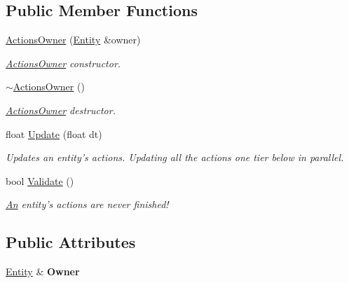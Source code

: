 \subsection*{Public Member Functions}
\begin{DoxyCompactItemize}
\item 
\hyperlink{classDCEngine_1_1ActionsOwner_a153d50a0c2e46d09d5896a21312e8f9f}{Actions\-Owner} (\hyperlink{classDCEngine_1_1Entity}{Entity} \&owner)
\begin{DoxyCompactList}\small\item\em \hyperlink{classDCEngine_1_1ActionsOwner}{Actions\-Owner} constructor. \end{DoxyCompactList}\item 
\hypertarget{classDCEngine_1_1ActionsOwner_ab79db9c50826b66f606ed06d115bc331}{\hyperlink{classDCEngine_1_1ActionsOwner_ab79db9c50826b66f606ed06d115bc331}{$\sim$\-Actions\-Owner} ()}\label{classDCEngine_1_1ActionsOwner_ab79db9c50826b66f606ed06d115bc331}

\begin{DoxyCompactList}\small\item\em \hyperlink{classDCEngine_1_1ActionsOwner}{Actions\-Owner} destructor. \end{DoxyCompactList}\item 
float \hyperlink{classDCEngine_1_1ActionsOwner_a65b0bc92323729657f1e4071f0300031}{Update} (float dt)
\begin{DoxyCompactList}\small\item\em Updates an entity's actions. Updating all the actions one tier below in parallel. \end{DoxyCompactList}\item 
\hypertarget{classDCEngine_1_1ActionsOwner_aeee0d8a5f5a7daf8e3c781d88d82259e}{bool \hyperlink{classDCEngine_1_1ActionsOwner_aeee0d8a5f5a7daf8e3c781d88d82259e}{Validate} ()}\label{classDCEngine_1_1ActionsOwner_aeee0d8a5f5a7daf8e3c781d88d82259e}

\begin{DoxyCompactList}\small\item\em \hyperlink{classAn}{An} entity's actions are never finished! \end{DoxyCompactList}\end{DoxyCompactItemize}
\subsection*{Public Attributes}
\begin{DoxyCompactItemize}
\item 
\hypertarget{classDCEngine_1_1ActionsOwner_a014a5f6b480286524d24047b37bd8e50}{\hyperlink{classDCEngine_1_1Entity}{Entity} \& {\bfseries Owner}}\label{classDCEngine_1_1ActionsOwner_a014a5f6b480286524d24047b37bd8e50}

\end{DoxyCompactItemize}
